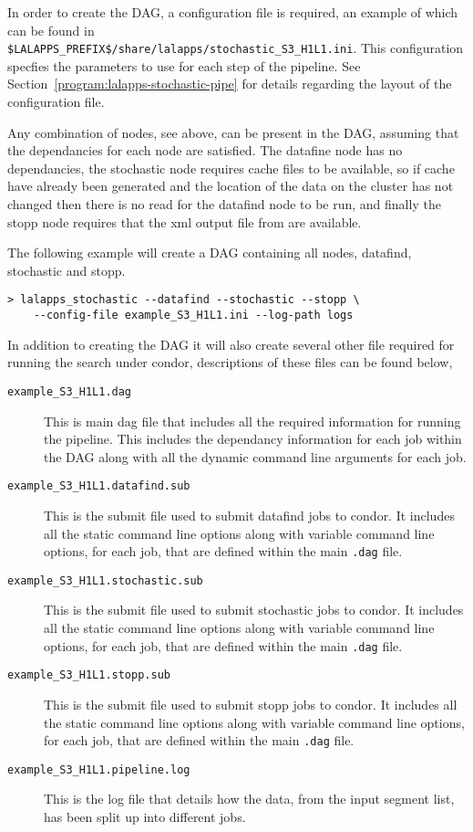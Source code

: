 In order to create the DAG, a configuration file is required, an example
of which can be found in\\
\texttt{\$LALAPPS\_PREFIX\$/share/lalapps/stochastic\_S3\_H1L1.ini}.
This configuration specfies the parameters to use for each step of the
pipeline. See Section~\ref{program:lalapps-stochastic-pipe} for details
regarding the layout of the configuration file.

Any combination of nodes, see above, can be present in the DAG, assuming
that the dependancies for each node are satisfied. The datafine node has
no dependancies, the stochastic node requires cache files to be
available, so if cache have already been generated and the location of
the data on the cluster has not changed then there is no read for the
datafind node to be run, and finally the stopp node requires that the
xml output file from  are available.

The following example will create a DAG containing all nodes, datafind,
stochastic and stopp.

\begin{verbatim}
> lalapps_stochastic --datafind --stochastic --stopp \
    --config-file example_S3_H1L1.ini --log-path logs
\end{verbatim}

In addition to creating the DAG it will also create several other file
required for running the search under condor, descriptions of these
files can be found below,

\begin{description}
\item[\texttt{example\_S3\_H1L1.dag}]
This is main dag file that includes all the required information for
running the pipeline. This includes the dependancy information for each
job within the DAG along with all the dynamic command line arguments for
each job.
\item[\texttt{example\_S3\_H1L1.datafind.sub}]
This is the submit file used to submit datafind jobs to condor. It
includes all the static command line options along with variable command
line options, for each job, that are defined within the main
\texttt{.dag} file.
\item[\texttt{example\_S3\_H1L1.stochastic.sub}]
This is the submit file used to submit stochastic jobs to condor. It
includes all the static command line options along with variable command
line options, for each job, that are defined within the main
\texttt{.dag} file.
\item[\texttt{example\_S3\_H1L1.stopp.sub}]
This is the submit file used to submit stopp jobs to condor. It
includes all the static command line options along with variable command
line options, for each job, that are defined within the main
\texttt{.dag} file.
\item[\texttt{example\_S3\_H1L1.pipeline.log}]
This is the log file that details how the data, from the input segment
list, has been split up into different jobs.
\end{description}

